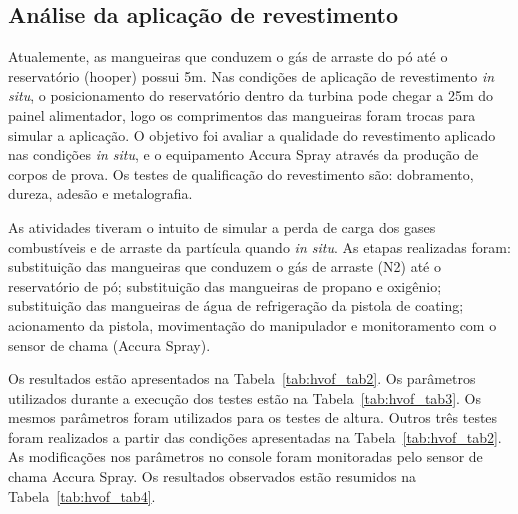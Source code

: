 \subsection{Análise da aplicação de revestimento}

Atualemente, as mangueiras que conduzem o gás de arraste do pó até o
reservatório (hooper) possui 5m. Nas condições de aplicação de revestimento
\textit{in situ}, o posicionamento do reservatório dentro da turbina pode chegar
a 25m do painel alimentador, logo os comprimentos das mangueiras foram trocas
para simular a aplicação. O objetivo foi avaliar a qualidade do revestimento
aplicado nas condições \textit{in situ}, e o equipamento Accura Spray através
da produção de corpos de prova. Os testes de qualificação do revestimento são:
dobramento, dureza, adesão e metalografia.

As atividades tiveram o intuito de simular a perda de carga dos gases
combustíveis e de arraste da partícula quando \textit{in situ}. As etapas
realizadas foram: substituição das mangueiras que conduzem o gás de arraste (N2)
até o reservatório de pó; substituição das mangueiras de propano e oxigênio;
substituição das mangueiras de água de refrigeração da pistola de coating;
acionamento da pistola, movimentação do manipulador e monitoramento com o sensor
de chama (Accura Spray).

Os resultados estão apresentados na Tabela~\ref{tab:hvof_tab2}. Os parâmetros
utilizados durante a execução dos testes estão na Tabela~\ref{tab:hvof_tab3}. Os
mesmos parâmetros foram utilizados para os testes de altura. Outros três testes
foram realizados a partir das condições apresentadas na
Tabela~\ref{tab:hvof_tab2}. As modificações nos parâmetros no console foram
monitoradas pelo sensor de chama Accura Spray. Os resultados observados estão
resumidos na Tabela~\ref{tab:hvof_tab4}.

